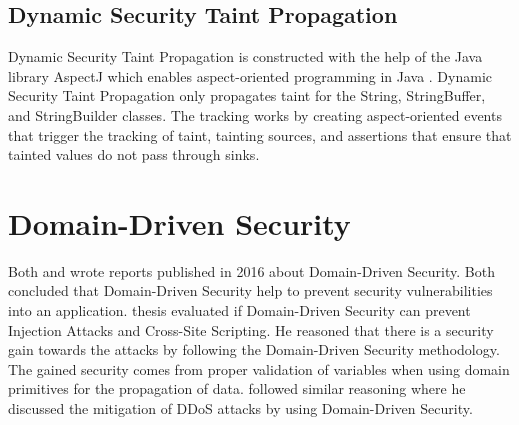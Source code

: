 \subsection{Dynamic Security Taint Propagation}
Dynamic Security Taint Propagation \parencite{securityTaint} is constructed with the help of the Java library AspectJ which enables aspect-oriented programming in Java \parencite{aspectj}. Dynamic Security Taint Propagation only propagates taint for the String, StringBuffer, and StringBuilder classes. The tracking works by creating aspect-oriented events that trigger the tracking of taint, tainting sources, and assertions that ensure that tainted values do not pass through sinks.



\section{Domain-Driven Security}
\label{RW:DomainDrivenSecurity}
Both \textcite{Stendahl2016} and \textcite{Arnor2016} wrote reports published in 2016 about Domain-Driven Security. Both concluded that Domain-Driven Security help to prevent security vulnerabilities into an application. \textcite{Stendahl2016} thesis evaluated if Domain-Driven Security can prevent Injection Attacks and Cross-Site Scripting. He reasoned that there is a security gain towards the attacks by following the Domain-Driven Security methodology. The gained security comes from proper validation of variables when using domain primitives for the propagation of data. \textcite{Arnor2016} followed similar reasoning where he discussed the mitigation of DDoS attacks by using Domain-Driven Security.